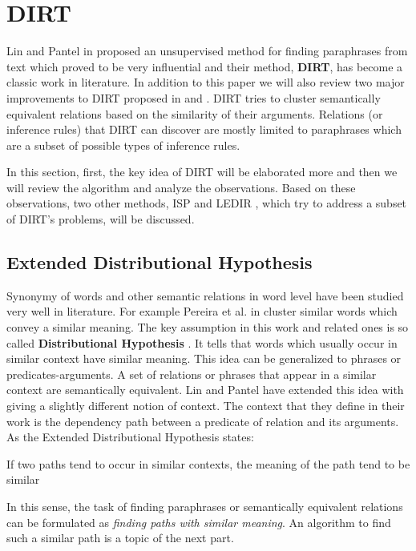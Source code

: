 \documentclass[12pt]{report}
\begin{document}
\section{DIRT}
\label{ch:unsupervised}

Lin and Pantel in \cite{Lin2001} proposed an unsupervised method for finding paraphrases from text which  
proved to be very influential and their method, \textbf{DIRT}, has become a classic work in literature.
 In addition
 to this paper we will also review two major improvements to DIRT proposed in \cite{Bhagat2007} and \cite{Pantel2007}.
DIRT tries to cluster semantically equivalent relations based on the similarity of their arguments. Relations
(or inference rules) that DIRT can discover are mostly limited to paraphrases which are a subset of possible types of inference rules.

In this section, first, the key idea of DIRT will be elaborated more and then we will review the algorithm and analyze the observations.
Based on these observations, two other methods, ISP \cite{Pantel2007} and LEDIR \cite{Bhagat2007}, 
which try to address a subset of DIRT's problems, will be discussed.

\subsection{Extended Distributional Hypothesis}
\label{ch:assumption}

Synonymy of words and other semantic relations in word level have been studied very well in literature.
For example Pereira et al. in \cite{Pereira1993} 
cluster similar words which convey a similar meaning. The key assumption in this work and related ones is so called
 \textbf{Distributional Hypothesis} \cite{Harris1981}
 . It tells that words which usually occur in similar context have similar meaning. This idea can be generalized
  to phrases or predicates-arguments. A set of relations or phrases that appear in a similar context
  are semantically equivalent. Lin and Pantel have extended this idea with giving a slightly different notion
   of context. The context that they define in their work is the dependency path between a predicate of
    relation and its arguments. As the Extended Distributional Hypothesis states:
    \begin{shaded}
     If two paths tend to occur in similar contexts, the meaning of the path tend to be similar 
    \end{shaded}
    
      
    In this sense, the task of finding paraphrases or semantically equivalent relations
     can be formulated as \emph{finding paths with similar meaning}. 
     An algorithm to find such a similar path is a topic of the next part.
\end{document}
